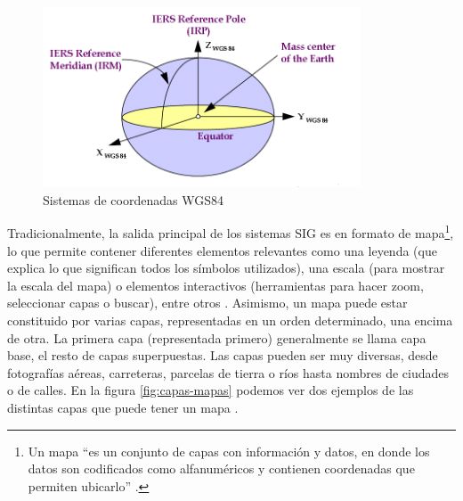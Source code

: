 \begin{figure}[H]
	\centering
	\includegraphics[height=5.35cm]{imagenes/capitulo2/Figure-36-World-Geodetic-System-1984-WGS84}
	\caption{Sistemas de coordenadas WGS84 \cite{WGS84}}
	\label{fig:WGS84}
\end{figure}


Tradicionalmente, la salida principal de los sistemas SIG es en formato de mapa\footnote{Un mapa ``es un conjunto de capas con información y datos, en donde los datos son codificados como alfanuméricos y contienen coordenadas que permiten ubicarlo'' \cite{congreso-ritsi}.}, lo que permite contener diferentes elementos relevantes como una leyenda (que explica lo que significan todos los símbolos utilizados), una escala (para mostrar la escala del mapa) o elementos interactivos (herramientas para hacer zoom, seleccionar capas o buscar), entre otros \cite{tesis}. Asimismo, un mapa puede estar constituido por varias capas, representadas en un orden determinado, una encima de otra. La primera capa (representada primero) generalmente se llama capa base, el resto de capas superpuestas. Las capas pueden ser muy diversas, desde fotografías aéreas, carreteras, parcelas de tierra o ríos hasta nombres de ciudades o de calles. En la figura \ref{fig:capas-mapas} podemos ver dos ejemplos de las distintas capas que puede tener un mapa \cite{VictorOlaya}.

